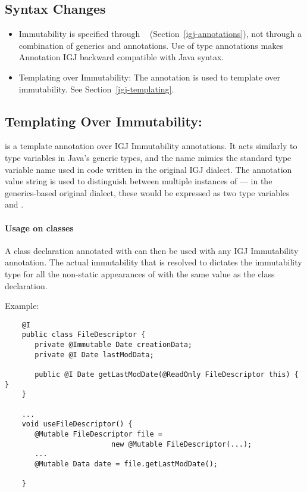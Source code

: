 \subsection{Syntax Changes}

\begin{itemize}

\item  Immutability is specified through
  ~\cite{JSR308-2008-09-12} (Section~\ref{igj-annotations}),
not through a combination of generics and annotations.  Use of type
annotations makes Annotation IGJ backward compatible with Java syntax.

\item Templating over Immutability: The annotation  is used to template
over immutability.  See Section~\ref{igj-templating}.

\end{itemize}


\subsection{Templating Over Immutability: \label{igj-templating}}

 is a template annotation over IGJ Immutability annotations. It acts
similarly to type variables in Java's generic types, and the name
 mimics the standard  type variable name used in code
written in the original IGJ dialect.  The annotation value string is used
to distinguish between multiple instances of  --- in the
generics-based original dialect, these would be expressed as two type
variables  and .

\paragraph{Usage on classes\label{igj-usage-on-classes}}

A class declaration annotated with  can then be
used with any IGJ Immutability annotation.  The actual immutability that
 is resolved to dictates the immutability type for all the non-static
appearances of  with the same value as the class declaration.

  Example:
\begin{Verbatim}
    @I
    public class FileDescriptor {
       private @Immutable Date creationData;
       private @I Date lastModData;

       public @I Date getLastModDate(@ReadOnly FileDescriptor this) { }
    }

    ...
    void useFileDescriptor() {
       @Mutable FileDescriptor file =
                         new @Mutable FileDescriptor(...);
       ...
       @Mutable Data date = file.getLastModDate();

    }
\end{Verbatim}

